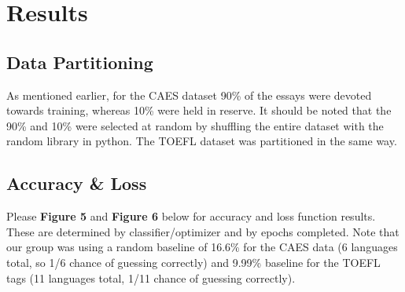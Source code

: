 \documentclass[12pt]{article}
\begin{document}
\section{Results}
\subsection{Data Partitioning}
As mentioned earlier, for the CAES dataset 90\% of the essays were devoted towards training, whereas 10\% were held in reserve. It should be noted that the 90\% and 10\% were selected at random by shuffling the entire dataset with the random library in python. The TOEFL dataset was partitioned in the same way.
\subsection{Accuracy \& Loss}
Please \textbf{Figure 5} and \textbf{Figure 6} below for accuracy and loss function results. These are determined by classifier/optimizer and by epochs completed. Note that our group was using a random baseline of 16.6\% for the CAES data (6 languages total, so 1/6 chance of guessing correctly) and 9.99\% baseline for the TOEFL tags (11 languages total, 1/11 chance of guessing correctly). \\
\end{document}
